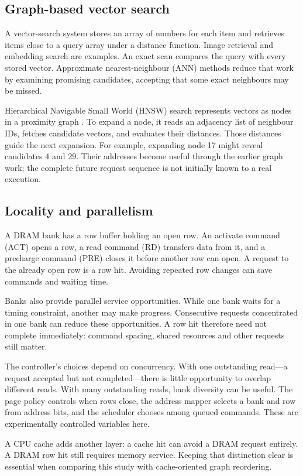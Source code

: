 \documentclass[conference]{IEEEtran}
\begin{document}
\subsection{Graph-based vector search}
A vector-search system stores an array of numbers for each item and retrieves items close to a query array under a distance function. Image retrieval and embedding search are examples. An exact scan compares the query with every stored vector. Approximate nearest-neighbour (ANN) methods reduce that work by examining promising candidates, accepting that some exact neighbours may be missed.

Hierarchical Navigable Small World (HNSW) search represents vectors as nodes in a proximity graph \cite{hnsw}. To expand a node, it reads an adjacency list of neighbour IDs, fetches candidate vectors, and evaluates their distances. Those distances guide the next expansion. For example, expanding node 17 might reveal candidates 4 and 29. Their addresses become useful through the earlier graph work; the complete future request sequence is not initially known to a real execution.

\subsection{Locality and parallelism}
A DRAM bank has a row buffer holding an open row. An activate command (ACT) opens a row, a read command (RD) transfers data from it, and a precharge command (PRE) closes it before another row can open. A request to the already open row is a row hit. Avoiding repeated row changes can save commands and waiting time.

Banks also provide parallel service opportunities. While one bank waits for a timing constraint, another may make progress. Consecutive requests concentrated in one bank can reduce these opportunities. A row hit therefore need not complete immediately: command spacing, shared resources and other requests still matter.

The controller's choices depend on concurrency. With one outstanding read---a request accepted but not completed---there is little opportunity to overlap different reads. With many outstanding reads, bank diversity can be useful. The page policy controls when rows close, the address mapper selects a bank and row from address bits, and the scheduler chooses among queued commands. These are experimentally controlled variables here.

A CPU cache adds another layer: a cache hit can avoid a DRAM request entirely. A DRAM row hit still requires memory service. Keeping that distinction clear is essential when comparing this study with cache-oriented graph reordering.
\end{document}
